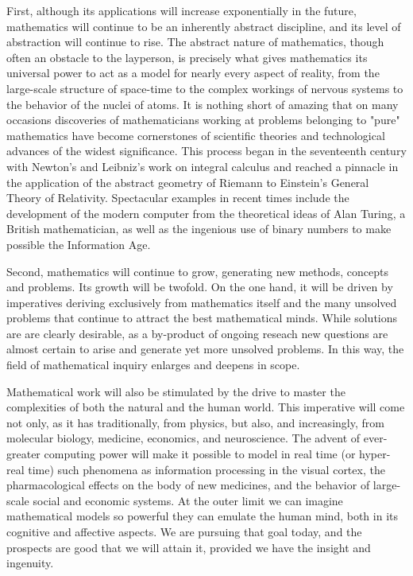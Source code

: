 First, although its applications will increase exponentially in the future, mathematics will continue to be an inherently abstract discipline, and its level of abstraction will continue to rise.  The abstract nature of mathematics, though often an obstacle to the layperson, is precisely what gives mathematics its universal power to act as a model for nearly every aspect of reality, from the large-scale structure of space-time to the complex workings of nervous systems to the behavior of the nuclei of atoms.   It is nothing short of amazing that on many occasions discoveries of mathematicians working at problems belonging to "pure" mathematics have become cornerstones of scientific theories and technological advances of the widest significance.  This process began in the seventeenth century with Newton's and Leibniz's work on integral calculus and reached a pinnacle in the application of the abstract geometry of Riemann to Einstein's General Theory of Relativity.  Spectacular examples in recent times include the development of the modern computer from the theoretical ideas of Alan Turing, a British mathematician, as well as the ingenious use of binary numbers to make possible the Information Age.
      
Second,  mathematics will continue to grow, generating new methods, concepts and problems.  Its growth will be twofold.  On the one hand, it will be driven by imperatives deriving exclusively from mathematics itself and the many unsolved problems that continue to attract the best mathematical minds.  While solutions are are clearly desirable, as a by-product of ongoing reseach new questions are almost certain to arise and generate yet more unsolved problems.  In this way, the field of mathematical inquiry enlarges and deepens in scope.
       
Mathematical work will also be stimulated by the drive to master the complexities of both the natural and the human world.  This imperative will come not only, as it has traditionally, from physics, but also, and increasingly, from molecular biology, medicine, economics, and neuroscience.  The advent of ever-greater computing power will make it possible to model in real time (or hyper-real time) such phenomena as information processing in the visual cortex, the pharmacological effects on the body of new medicines, and the behavior of large-scale social and economic systems.  At the outer limit we can imagine mathematical models so powerful they can emulate the human mind, both in its cognitive and affective aspects.  We are pursuing that goal today, and the prospects are good that we will attain it, provided we have the insight and ingenuity.

